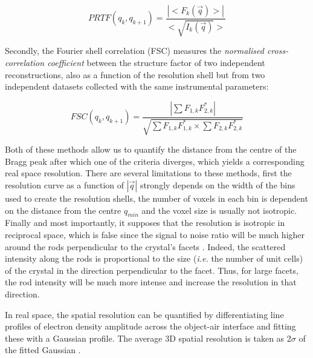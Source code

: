 \begin{equation}
    PRTF(q_k, q_{k+1}) = \frac{|<F_k(\vec{q})>|}{<\sqrt{I_k(\vec{q})}>}
\end{equation}

Secondly, the Fourier shell correlation (FSC) \parencite{VanHeel2005} measures the \textit{normalised cross-correlation coefficient} between the structure factor of two independent reconstructions, also as a function of the resolution shell but from two independent datasets collected with the same instrumental parameters:

\begin{equation}
    FSC(q_k, q_{k+1}) = \frac{ |\sum F_{1,k} F_{2,k}^*| }{\sqrt{ \sum F_{1,k} F_{1,k}^* \times \sum F_{2,k} F_{2,k}^*}}
\end{equation}

Both of these methods allow us to quantify the distance from the centre of the Bragg peak after which one of the criteria diverges, which yields a corresponding real space resolution.
There are several limitations to these methods, first the resolution curve as a function of $|\vec{q}|$ strongly depends on the width of the bins used to create the resolution shells, the number of voxels in each bin is dependent on the distance from the centre $q_{min}$ and the voxel size is usually not isotropic.
Finally and most importantly, it supposes that the resolution is isotropic in reciprocal space, which is false since the signal to noise ratio will be much higher around the rods perpendicular to the crystal's facets \parencite{Cherukara2018a}.
Indeed, the scattered intensity along the rods is proportional to the size (\textit{i.e.} the number of unit cells) of the crystal in the direction perpendicular to the facet.
Thus, for large facets, the rod intensity will be much more intense and increase the resolution in that direction.

In real space, the spatial resolution can be quantified by differentiating line profiles of electron density amplitude across the object-air interface and fitting these with a Gaussian profile.
The average 3D spatial resolution is taken as 2$\sigma$ of the fitted Gaussian \parencite{Hofmann2020}.

